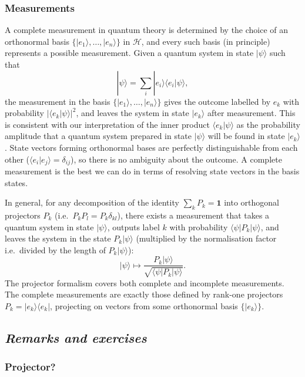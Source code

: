 \documentclass[fleqn,a4paper]{article}
\theoremstyle{definition}
\theoremstyle{definition}
\theoremstyle{definition}
\theoremstyle{definition}
\theoremstyle{remark}
\begin{document}
\hypertarget{measurements-1}{%
\subsubsection{Measurements}\label{measurements-1}}

A complete measurement in quantum theory is determined by the choice of an orthonormal basis \(\{|e_1\rangle,\ldots,|e_n\rangle\}\) in \(\mathcal{H}\), and every such basis (in principle) represents a possible measurement.
Given a quantum system in state \(|\psi\rangle\) such that
\[
  |\psi\rangle = \sum_i |e_i\rangle\langle e_i|\psi\rangle,
\]
the measurement in the basis \(\{|e_1\rangle,\ldots,|e_n\rangle\}\) gives the outcome labelled by \(e_k\) with probability \(|\langle e_k|\psi\rangle|^2\), and leaves the system in state \(|e_k\rangle\) after measurement.
This is consistent with our interpretation of the inner product \(\langle e_k|\psi\rangle\) as the probability amplitude that a quantum system prepared in state \(|\psi\rangle\) will be found in state \(|e_k\rangle\).
State vectors forming orthonormal bases are perfectly distinguishable from each other (\(\langle e_i|e_j\rangle=\delta_{ij}\)), so there is no ambiguity about the outcome.
A complete measurement is the best we can do in terms of resolving state vectors in the basis states.

In general, for any decomposition of the identity \(\sum_k P_k=\mathbf{1}\) into orthogonal projectors \(P_k\) (i.e.~\(P_kP_l = P_k\delta_{kl}\)), there exists a measurement that takes a quantum system in state \(|\psi\rangle\), outputs label \(k\) with probability \(\langle\psi|P_k|\psi\rangle\), and leaves the system in the state \(P_k|\psi\rangle\) (multiplied by the normalisation factor i.e.~divided by the length of \(P_k|\psi\rangle\)):
\[
  |\psi\rangle
  \mapsto
  \frac{P_k|\psi\rangle}{\sqrt{\langle\psi|P_k|\psi\rangle}}.
\]
The projector formalism covers both complete and incomplete measurements.
The complete measurements are exactly those defined by rank-one projectors \(P_k=|e_k\rangle\langle e_k|\), projecting on vectors from some orthonormal basis \(\{|e_k\rangle\}\).

\hypertarget{remarks-and-exercises-measurement}{%
\subsection{\texorpdfstring{\emph{Remarks and exercises}}{Remarks and exercises}}\label{remarks-and-exercises-measurement}}

\hypertarget{projector}{%
\subsubsection{Projector?}\label{projector}}
\end{document}
